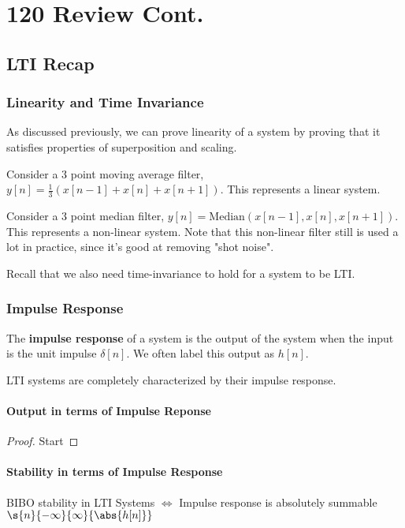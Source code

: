 \documentclass{report}
\begin{document}
\chapter{120 Review Cont.}

\section{LTI Recap}
\subsection{Linearity and Time Invariance}
As discussed previously, we can prove linearity of a system by proving that it satisfies properties of superposition and scaling.

\theoremstyle{definition}
\begin{example}
    Consider a 3 point moving average filter, $y[n] = \frac{1}{3} (x[n - 1] + x[n] + x[n + 1])$. This represents a linear system.
\end{example}
\begin{example}
    Consider a 3 point median filter, $y[n] = \mathrm{Median}(x[n - 1], x[n], x[n + 1])$. This represents a non-linear system. Note that this non-linear filter still is used a lot in practice, since it's good at removing "shot noise".
\end{example}
Recall that we also need time-invariance to hold for a system to be LTI.
\subsection{Impulse Response}
\begin{definition}
    The \textbf{impulse response} of a system is the output of the system when the input is the unit impulse $\delta[n]$. We often label this output as $h[n]$.
\end{definition}
LTI systems are completely characterized by their impulse response.
\subsubsection{Output in terms of Impulse Reponse}
\begin{proof}
    Start
\end{proof}
\subsubsection{Stability in terms of Impulse Response}
\begin{theorem}
    BIBO stability in LTI Systems $\iff$ Impulse response is absolutely summable $\s{n}{-\infty}{\infty}{\abs{h[n]}}$
\end{theorem}
\end{document}
